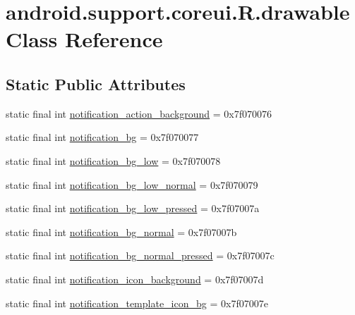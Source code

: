 \hypertarget{classandroid_1_1support_1_1coreui_1_1_r_1_1drawable}{}\section{android.\+support.\+coreui.\+R.\+drawable Class Reference}
\label{classandroid_1_1support_1_1coreui_1_1_r_1_1drawable}
\subsection*{Static Public Attributes}
\begin{DoxyCompactItemize}
\item 
static final int \mbox{\hyperlink{classandroid_1_1support_1_1coreui_1_1_r_1_1drawable_a82491dac97c48bc1455f0385a70b2ddf}{notification\+\_\+action\+\_\+background}} = 0x7f070076
\item 
static final int \mbox{\hyperlink{classandroid_1_1support_1_1coreui_1_1_r_1_1drawable_a1c8146145db024a50e235921fc2cc2da}{notification\+\_\+bg}} = 0x7f070077
\item 
static final int \mbox{\hyperlink{classandroid_1_1support_1_1coreui_1_1_r_1_1drawable_a95fb51d823631a171628dbd2f001a6bf}{notification\+\_\+bg\+\_\+low}} = 0x7f070078
\item 
static final int \mbox{\hyperlink{classandroid_1_1support_1_1coreui_1_1_r_1_1drawable_afe30750d9bfc3bfd5420ea52b84dfb4e}{notification\+\_\+bg\+\_\+low\+\_\+normal}} = 0x7f070079
\item 
static final int \mbox{\hyperlink{classandroid_1_1support_1_1coreui_1_1_r_1_1drawable_a5e3dd2843d22fa341656b1fe71764f0d}{notification\+\_\+bg\+\_\+low\+\_\+pressed}} = 0x7f07007a
\item 
static final int \mbox{\hyperlink{classandroid_1_1support_1_1coreui_1_1_r_1_1drawable_abcb37071db3c22f947558bb671447744}{notification\+\_\+bg\+\_\+normal}} = 0x7f07007b
\item 
static final int \mbox{\hyperlink{classandroid_1_1support_1_1coreui_1_1_r_1_1drawable_ae6e843ccd22ef31f6234459f7a677a66}{notification\+\_\+bg\+\_\+normal\+\_\+pressed}} = 0x7f07007c
\item 
static final int \mbox{\hyperlink{classandroid_1_1support_1_1coreui_1_1_r_1_1drawable_ab86830b1048554d986d5aa69cd4630f4}{notification\+\_\+icon\+\_\+background}} = 0x7f07007d
\item 
static final int \mbox{\hyperlink{classandroid_1_1support_1_1coreui_1_1_r_1_1drawable_a07e55740f0809357a6cca5a6f96f383b}{notification\+\_\+template\+\_\+icon\+\_\+bg}} = 0x7f07007e

\end{DoxyCompactItemize}
